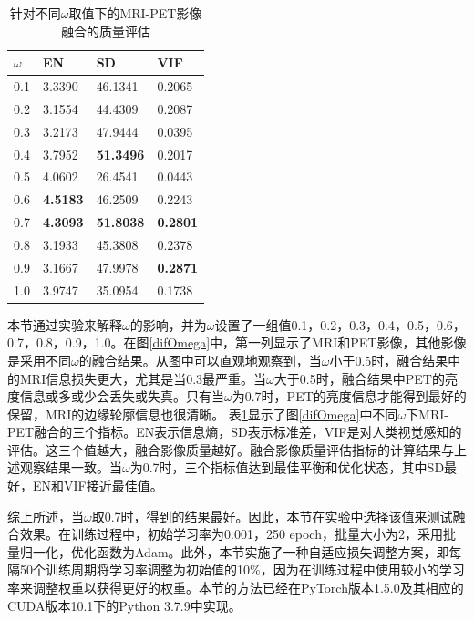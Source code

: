 \begin{table}[ht]
\centering
\caption{针对不同$\omega$取值下的MRI-PET影像融合的质量评估}\label{difOmega_evaluation}
\begin{tabular}{m{2cm}<{\centering}m{3cm}<{\centering}m{3cm}<{\centering}m{3cm}<{\centering}} 
\hline
\textbf{$\omega$} & \textbf{EN}     & \textbf{SD}      & \textbf{VIF}   \\\hline
0.1        & 3.3390          & 46.1341          & 0.2065          \\
0.2        & 3.1554          & 44.4309          & 0.2087          \\
0.3        & 3.2173          & 47.9444          & 0.0395          \\
0.4        & 3.7952          & \textbf{51.3496} & 0.2017          \\
0.5        & 4.0602          & 26.4541          & 0.0443          \\
0.6        & \textbf{4.5183} & 46.2509          & 0.2243          \\
0.7        & \textbf{4.3093} & \textbf{51.8038} & \textbf{0.2801} \\
0.8        & 3.1933          & 45.3808          & 0.2378          \\
0.9        & 3.1667          & 47.9978          & \textbf{0.2871} \\
1.0        & 3.9747          & 35.0954          & 0.1738      \\ \hline   
\end{tabular}
\end{table}
本节通过实验来解释$\omega$的影响，并为$\omega$设置了一组值{0.1，0.2，0.3，0.4，0.5，0.6，0.7，0.8，0.9，1.0}。在图\ref{difOmega}中，第一列显示了MRI和PET影像，其他影像是采用不同$\omega$的融合结果。从图中可以直观地观察到，当$\omega$小于0.5时，融合结果中的MRI信息损失更大，尤其是当0.3最严重。当$\omega$大于0.5时，融合结果中PET的亮度信息或多或少会丢失或失真。只有当$\omega$为0.7时，PET的亮度信息才能得到最好的保留，MRI的边缘轮廓信息也很清晰。
表\ref{difOmega_evaluation}显示了图\ref{difOmega}中不同$\omega$下MRI-PET融合的三个指标。EN表示信息熵，SD表示标准差，VIF是对人类视觉感知的评估。这三个值越大，融合影像质量越好。融合影像质量评估指标的计算结果与上述观察结果一致。当$\omega$为0.7时，三个指标值达到最佳平衡和优化状态，其中SD最好，EN和VIF接近最佳值。


综上所述，当$\omega$取0.7时，得到的结果最好。因此，本节在实验中选择该值来测试融合效果。在训练过程中，初始学习率为0.001，250 epoch，批量大小为2，采用批量归一化，优化函数为Adam。此外，本节实施了一种自适应损失调整方案，即每隔50个训练周期将学习率调整为初始值的10\%，因为在训练过程中使用较小的学习率来调整权重以获得更好的权重。本节的方法已经在PyTorch版本1.5.0及其相应的CUDA版本10.1下的Python 3.7.9中实现。


